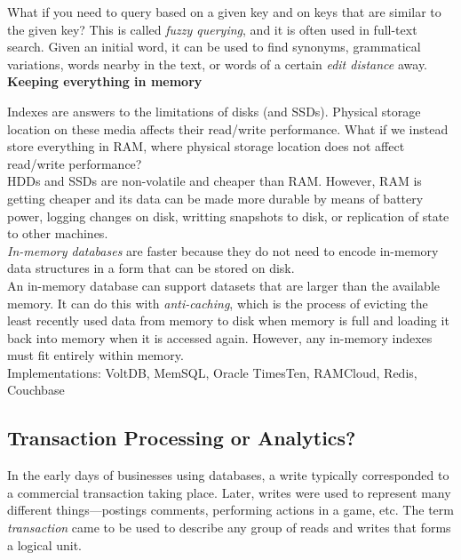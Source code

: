 \documentclass[12pt, titlepage]{article}
\newcommand{\subsubsubsection}[1]{\small \textbf{#1} \medskip}
\begin{document}
What if you need to query based on a given key and on keys that are similar to the given key? This is called \textit{fuzzy querying}, and it is often used in full-text search. Given an initial word, it can be used to find synonyms, grammatical variations, words nearby in the text, or words of a certain \textit{edit distance} away. \\

\subsubsubsection{Keeping everything in memory}

Indexes are answers to the limitations of disks (and SSDs). Physical storage location on these media affects their read/write performance. What if we instead store everything in RAM, where physical storage location does not affect read/write performance? \\

HDDs and SSDs are non-volatile and cheaper than RAM. However, RAM is getting cheaper and its data can be made more durable by means of battery power, logging changes on disk, writting snapshots to disk, or replication of state to other machines. \\

\textit{In-memory databases} are faster because they do not need to encode in-memory data structures in a form that can be stored on disk. \\

An in-memory database can support datasets that are larger than the available memory. It can do this with \textit{anti-caching}, which is the process of evicting the least recently used data from memory to disk when memory is full and loading it back into memory when it is accessed again. However, any in-memory indexes must fit entirely within memory. \\

Implementations: VoltDB, MemSQL, Oracle TimesTen, RAMCloud, Redis, Couchbase

\subsection{Transaction Processing or Analytics?}

In the early days of businesses using databases, a write typically corresponded to a commercial transaction taking place. Later, writes were used to represent many different things---postings comments, performing actions in a game, etc. The term \textit{transaction} came to be used to describe any group of reads and writes that forms a logical unit. \\
\end{document}
